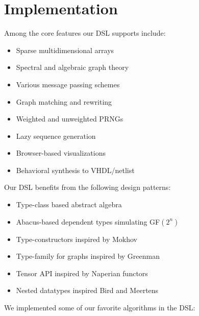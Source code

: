 \documentclass[sigplan,10pt,review,anonymous]{acmart}
\begin{document}
\section{Implementation}

Among the core features our DSL supports include:

\begin{itemize}
  \item Sparse multidimensional arrays
  \item Spectral and algebraic graph theory
  \item Various message passing schemes
  \item Graph matching and rewriting
  \item Weighted and unweighted PRNGs
  \item Lazy sequence generation
  \item Browser-based visualizations
  \item Behavioral synthesis to VHDL/netlist
\end{itemize}

\noindent Our DSL benefits from the following design patterns:

\begin{itemize}
  \item Type-class based abstract algebra
  \item Abacus-based dependent types simulating GF$(2^n)$
  \item Type-constructors inspired by Mokhov~\citep{mokhov2017algebraic}
  \item Type-family for graphs inspired by Greenman ~\citep{greenman2014getting}
  \item Tensor API inspired by Naperian functors~\citep{gibbons2017aplicative}
  \item Nested datatypes inspired Bird and Meertens~\cite{bird1998nested}
\end{itemize}

\noindent We implemented some of our favorite algorithms in the DSL:
\end{document}
